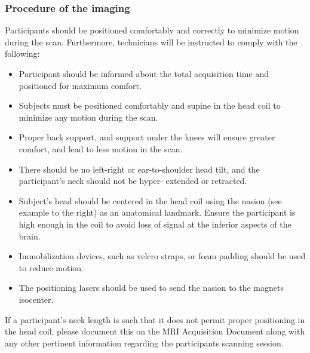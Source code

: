 \documentclass[
	a4paper, 
	11.5pt,
	headings=small, 
	twoside, 
	titlepage=firstiscover, 
 	pagesize=auto,
  	version=last,
	open=any,
	BCOR=14mm,
  	chapterprefix=false]{scrbook}
\begin{document}
\subsubsection{Procedure of the imaging}
Participants should be positioned comfortably and correctly to minimize motion during the scan. Furthermore, technicians will be instructed to comply with the following:
\begin{itemize}
\item Participant should be informed about the total acquisition time and positioned for maximum comfort.
\item Subjects must be positioned comfortably and supine in the head coil to minimize any motion during the scan.
\item Proper back support, and support under the knees will ensure greater comfort, and lead to less motion in the scan.
\item There should be no left-right or ear-to-shoulder head tilt, and the participant’s neck should not be hyper- extended or retracted.
\item Subject's head should be centered in the head coil using the nasion (see example to the right) as an anatomical landmark. Ensure the participant is high enough in the coil to avoid loss of signal at the inferior aspects of the brain.
\item Immobilization devices, such as velcro straps, or foam padding should be used to reduce motion.
\item The positioning lasers should be used to send the nasion to the magnets isocenter.
\end{itemize}
If a participant’s neck length is such that it does not permit proper positioning in the head coil, please document this on the \ac{MRI} Acquisition Document along with any other pertinent information regarding the participants scanning session.
\end{document}
